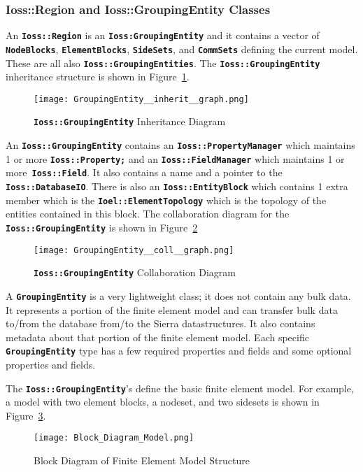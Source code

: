 \documentclass[11pt,twoside]{article}
\newcommand{\code}[1]
   {\mbox{\bf\tt #1}\null}
\begin{document}
\subsubsection{Ioss::Region and Ioss::GroupingEntity Classes}
An \code{Ioss::Region} is an
\code{Ioss:GroupingEntity} and it contains a vector of
\code{NodeBlocks}, \code{ElementBlocks},
\code{SideSets}, and \code{CommSets} defining the current model. These are all
also \code{Ioss::GroupingEntities}. The
\code{Ioss::GroupingEntity} inheritance structure is shown in Figure~\ref{fig:ge_inherit}.
\begin{figure}[htp]
\centering
\texttt{[image: GroupingEntity\_\_inherit\_\_graph.png]}
\caption{\code{Ioss::GroupingEntity} Inheritance Diagram}\label{fig:ge_inherit}
\end{figure}
An \code{Ioss::GroupingEntity}
contains an \code{Ioss::PropertyManager} which maintains 1 or
more \code{Ioss::Property;} and an
\code{Ioss::FieldManager} which maintains 1 or
more\code{ Ioss::Field}. It also contains a name and a
pointer to the \code{Ioss::DatabaseIO}. There is also an
\code{Ioss::EntityBlock} which contains 1 extra member which
is the \code{Ioel::ElementTopology} which is the topology of
the entities contained in this block. The collaboration diagram for
the \code{Ioss::GroupingEntity} is shown in Figure~\ref{fig:ge_collab}
\begin{figure}[htp]
\centering
\texttt{[image: GroupingEntity\_\_coll\_\_graph.png]}
\caption{\code{Ioss::GroupingEntity} Collaboration Diagram}\label{fig:ge_collab}
\end{figure}

A \code{GroupingEntity} is a very lightweight class; it does
not contain any bulk data. It represents a portion of the finite
element model and can transfer bulk data to/from the database from/to
the Sierra datastructures. It also contains metadata about that portion
of the finite element model. Each specific
\code{GroupingEntity} type has a few required properties and
fields and some optional properties and fields.

The \code{Ioss::GroupingEntity}'s define the basic finite
element model. For example, a model with two element blocks, a nodeset,
and two sidesets is shown in Figure~\ref{fig:block}.
\begin{figure}[htp]
\centering
\texttt{[image: Block\_Diagram\_Model.png]}
\caption{Block Diagram of Finite Element Model Structure}\label{fig:block}
\end{figure}
\end{document}
